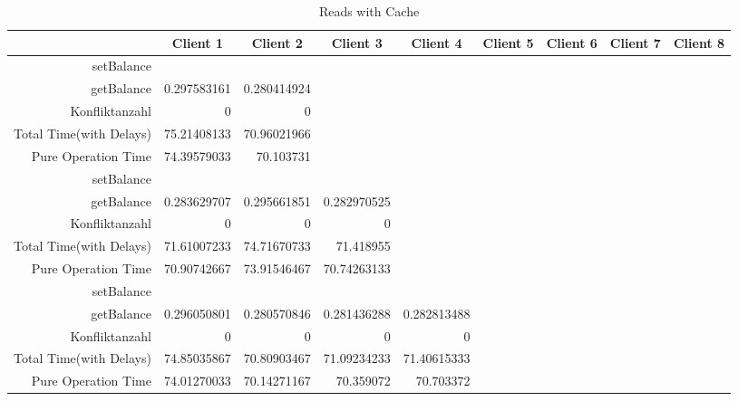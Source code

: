 \begin{landscape}
\begin{table}[htbp]
\scriptsize
  \centering
  \caption{Reads with Cache}
    \begin{tabular}{rrrrrrrrr}
    \toprule
          & \multicolumn{1}{c}{Client 1} & \multicolumn{1}{c}{Client 2} & \multicolumn{1}{c}{Client 3} & \multicolumn{1}{c}{Client 4} & \multicolumn{1}{c}{Client 5} & \multicolumn{1}{c}{Client 6} & \multicolumn{1}{c}{Client 7} & \multicolumn{1}{c}{Client 8} \\
    \midrule
    setBalance &       &       &       &       &       &       &       &  \\
    getBalance & 0.297583161 & 0.280414924 &       &       &       &       &       &  \\
    Konfliktanzahl & 0     & 0     &       &       &       &       &       &  \\
    Total Time(with Delays) & 75.21408133 & 70.96021966 &       &       &       &       &       &  \\
    Pure Operation Time & 74.39579033 & 70.103731 &       &       &       &       &       &  \\
\cline{1-9}    
    setBalance &       &       &       &       &       &       &       &  \\
    getBalance & 0.283629707 & 0.295661851 & 0.282970525 &       &       &       &       &  \\
    Konfliktanzahl & 0     & 0     & 0     &       &       &       &       &  \\
    Total Time(with Delays) & 71.61007233 & 74.71670733 & 71.418955 &       &       &       &       &  \\
    Pure Operation Time & 70.90742667 & 73.91546467 & 70.74263133 &       &       &       &       &  \\
\cline{1-9}   
    setBalance &       &       &       &       &       &       &       &  \\
    getBalance & 0.296050801 & 0.280570846 & 0.281436288 & 0.282813488 &       &       &       &  \\
    Konfliktanzahl & 0     & 0     & 0     & 0     &       &       &       &  \\
    Total Time(with Delays) & 74.85035867 & 70.80903467 & 71.09234233 & 71.40615333 &       &       &       &  \\
    Pure Operation Time & 74.01270033 & 70.14271167 & 70.359072 & 70.703372 &       &       &       &  \\

\end{tabular}
\end{table}
\end{landscape}
